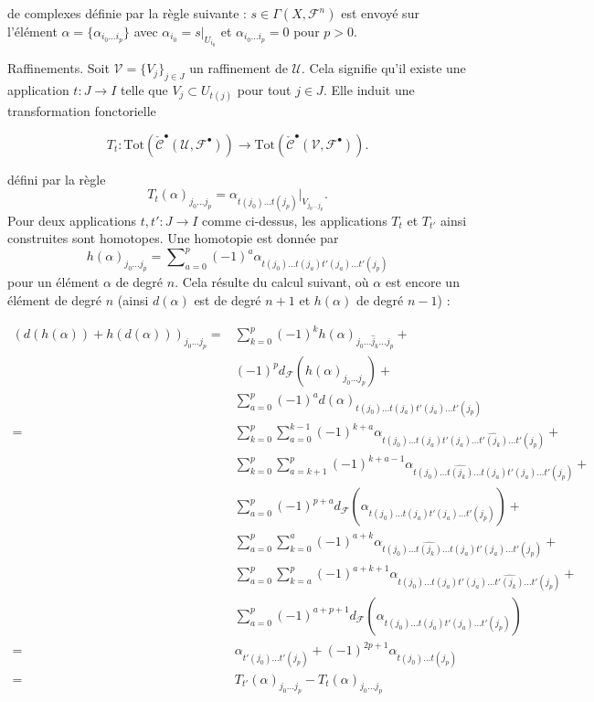 de complexes définie par la règle suivante :
$s\in \Gamma(X, {\mathcal F}^n)$
est envoyé sur l'élément $\alpha = \{\alpha_{i_0\ldots i_p}\}$
avec $\alpha_{i_0} = s|_{U_{i_0}}$ et $\alpha_{i_0\ldots i_p} = 0$
pour $p > 0$.

\medskip\noindent

Raffinements. Soit ${\mathcal V} = \{ V_j \}_{j\in J}$ un raffinement de ${\mathcal U}$. Cela signifie qu'il existe une application $t: J \to I$
telle que $V_j \subset U_{t(j)}$ pour tout $j\in J$. Elle induit une transformation fonctorielle

\begin{equation}
\label{equation-transformation}
T_t :
\text{Tot}(\check{\mathcal{C}}^\bullet({\mathcal U}, {\mathcal F}^\bullet))
\longrightarrow
\text{Tot}(\check{\mathcal{C}}^\bullet({\mathcal V}, {\mathcal F}^\bullet)).
\end{equation}

défini par la règle
$$
T_t(\alpha)_{j_0\ldots j_p}
=
\alpha_{t(j_0)\ldots t(j_p)}|_{V_{j_0\ldots j_p}}.
$$
Pour deux applications $t, t' : J \to I$ comme ci-dessus, les applications
$T_t$ et $T_{t'}$ ainsi construites sont homotopes. Une homotopie est donnée par
$$
h(\alpha)_{j_0\ldots j_p}
=
\sum\nolimits_{a = 0}^{p}
(-1)^a
\alpha_{t(j_0)\ldots t(j_a) t'(j_a) \ldots t'(j_p)}
$$
pour un élément $\alpha$ de degré $n$. Cela résulte du calcul suivant, où
$\alpha$ est encore un élément de degré $n$ (ainsi $d(\alpha)$
est de degré $n + 1$ et $h(\alpha)$ de degré $n - 1$) :

\begin{align*}
(
d(h(\alpha)) + h(d(\alpha))
)_{j_0\ldots j_p}
= &
\sum\nolimits_{k = 0}^p
(-1)^k
h(\alpha)_{j_0 \ldots \hat j_k \ldots j_p}
+ \\
&
(-1)^p
d_{\mathcal F}(h(\alpha)_{j_0 \ldots j_p})
+ \\
&
\sum\nolimits_{a = 0}^p
(-1)^a
d(\alpha)_{t(j_0) \ldots t(j_a) t'(j_a) \ldots t'(j_p)}
\\
= &
\sum\nolimits_{k = 0}^p
\sum\nolimits_{a = 0}^{k - 1}
(-1)^{k + a}
\alpha_{t(j_0)\ldots t(j_a)t'(j_a)\ldots \hat{t'(j_k)}\ldots t'(j_p)}
+ \\
&
\sum\nolimits_{k = 0}^p
\sum\nolimits_{a = k + 1}^p
(-1)^{k + a - 1}
\alpha_{t(j_0)\ldots \hat{t(j_k)}\ldots t(j_a)t'(j_a)\ldots t'(j_p)}
+ \\
&
\sum\nolimits_{a = 0}^p
(-1)^{p + a}
d_{\mathcal F}(\alpha_{t(j_0)\ldots t(j_a) t'(j_a) \ldots t'(j_p)})
+ \\
&
\sum\nolimits_{a = 0}^p
\sum\nolimits_{k = 0}^a
(-1)^{a + k}
\alpha_{t(j_0)\ldots\hat{t(j_k)}\ldots t(j_a)t'(j_a)\ldots t'(j_p)}
+ \\
&
\sum\nolimits_{a = 0}^p
\sum\nolimits_{k = a}^p
(-1)^{a + k + 1}
\alpha_{t(j_0) \ldots t(j_a) t'(j_a) \ldots \hat{t'(j_k)} \ldots t'(j_p)}
+ \\
&
\sum\nolimits_{a = 0}^p
(-1)^{a + p + 1}
d_{\mathcal F}(\alpha_{t(j_0)\ldots t(j_a) t'(j_a) \ldots t'(j_p)})
\\
= &
\alpha_{t'(j_0)\ldots t'(j_p)} +
(-1)^{2p + 1}\alpha_{t(j_0)\ldots t(j_p)}
\\
= &
T_{t'}(\alpha)_{j_0\ldots j_p} - T_t(\alpha)_{j_0\ldots j_p}
\end{align*}

